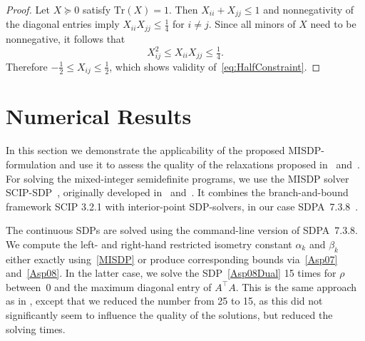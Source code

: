 \documentclass[journal]{IEEEtran}
\newcommand{\T}{^{\top}}
\newcommand{\Tr}{\text{Tr}}
\begin{document}
\begin{proof}
  Let $X \succeq 0$ satisfy $\Tr(X)=1$. Then $X_{ii}+X_{jj}\leq 1$ and
  nonnegativity of the diagonal entries imply $X_{ii}X_{jj}\leq
  \tfrac{1}{4}$ for $i \neq j$. Since all minors of $X$ need to be nonnegative, it
  follows that
  \begin{equation*}
    X_{ij}^2 \leq  X_{ii} X_{jj} \leq \tfrac{1}{4}.
  \end{equation*}
  Therefore $- \tfrac{1}{2} \leq X_{ij} \leq \tfrac{1}{2}$, which shows
  validity of~\eqref{eq:HalfConstraint}.
\end{proof}


\section{Numerical Results}
\label{sec:numerical_results}

\noindent
In this section we demonstrate the applicability of the proposed MISDP-formulation and use it to
assess the quality of the relaxations proposed in~\cite{Asp08} and~\cite{Asp07}.
For solving the mixed-integer semidefinite programs, we use the MISDP solver SCIP-SDP~\cite{SCIP-SDP,GalPU16},
originally developed in~\cite{Mar13} and~\cite{MS12}. It combines the
branch-and-bound framework SCIP 3.2.1 \cite{SCIP} with 
interior-point SDP-solvers, in our case SDPA~7.3.8~\cite{SDPA6,SDPA7}.

The continuous SDPs are solved using the command-line version of
SDPA~7.3.8. We compute the left- and right-hand restricted isometry
constant $\alpha_k$ and $\beta_k$ either exactly using~\eqref{MISDP} or
produce corresponding bounds via~\eqref{Asp07} and~\eqref{Asp08}. In
the latter case, we solve the SDP~\eqref{Asp08Dual} 15 times for $\rho$ between~$0$ and the maximum
diagonal entry of $A\T A$. This is the same approach as in \cite{Asp08},
except that we reduced the number from 25 to 15, as this did
not significantly seem to influence the quality of the solutions,
but reduced the solving times.
\end{document}
